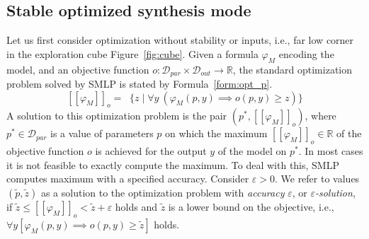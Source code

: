 \documentclass[a4paper,parskip=half]{article} %
\newcommand\removed[1]{}
\newcommand\added[1]{#1}
\newcommand\changedto[2]{%
    \removed{#1}%
    \added{#2}}
\newcommand*\eqdef=
\newcommand*\regmax[2]{[[{#1}]]_{#2}}
\newcommand*\objv{o}
\begin{document}
\subsection{Stable optimized synthesis mode}\label{sec:stable:opt:synthesis}



Let us first consider optimization without stability or inputs, i.e., far low corner in the exploration cube Figure~\ref{fig:cube}. 
Given a formula
$\varphi_M$ encoding the model, and an objective function 
$\objv:
\mathcal{D}_{\mathit{par}}\times
\mathcal{D}_\mathit{out}\to\mathbb R$, the
standard optimization problem solved by SMLP is stated by Formula~\eqref{form:opt_p}.
 \begin{equation}\label{form:opt_p}
 \regmax{\varphi_M}{\objv}
 \eqdef\mathop{\max\limits_{p}} \{z \mid  
    \forall y\changedto[{~(} \varphi_M(p,y)  \implies  
    \objv(p,y) \geq z
    \changedto])\}
\end{equation}
A solution to this optimization problem  is the pair $(p^*,\regmax{\varphi_M}{\objv})$, where 
$p^*{}\in\mathcal{D}_{\mathit{par}}$ is a value of parameters $p$ on which the maximum 
$\regmax{\varphi_M}{\objv}\in\mathbb R$ of the objective function $\objv$ is achieved
for the output $y$ of the model on $p^*$.
In most cases it is not feasible to exactly compute the maximum.
To deal with this, SMLP computes maximum with a specified accuracy. 
Consider $\varepsilon >0$.  We refer to  values $(\tilde p,\tilde z)$ as a solution to the optimization problem with
\emph{accuracy} $\varepsilon$, or \emph{$\varepsilon$-solution},
if $\tilde z\leq \regmax{ \varphi_M}{\objv}  <\tilde z+\varepsilon$ holds and
$\tilde z$ is a lower bound on the objective, i.e., $\forall y [ \varphi_M(p,y)  \implies  
    \objv(p,y) \geq \tilde z] $ holds.
\end{document}
